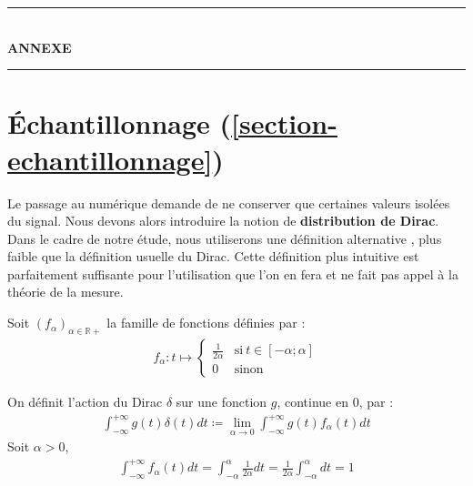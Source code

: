 \begin{center}
    \rule{\textwidth}{1pt} \\[0.5cm]
    {\Huge \bfseries ANNEXE} \\[0.4cm]
    \rule{\textwidth}{1pt}
\end{center}

\section*{Échantillonnage (\ref{section-echantillonnage})}
\label{preuve-echantillonnage}

Le passage au numérique demande de ne conserver que certaines valeurs isolées du signal. Nous devons alors introduire la notion de \textbf{distribution de Dirac}. Dans le cadre de notre étude, nous utiliserons une définition alternative \cite{dirac} , plus faible que la définition usuelle du Dirac. Cette définition plus intuitive est parfaitement suffisante pour l'utilisation que l'on en fera et ne fait pas appel à la théorie de la mesure.

Soit $(f_\alpha)_{\alpha \in \mathbb{\mathbb{R}+}}$ la famille de fonctions définies par :
\begin{align*}
    f_\alpha : t \mapsto \left\{ \begin{array}{cl} \frac{1}{2\alpha} & \text{si} \ t \in [-\alpha;\alpha] \\ 0 &  \text{sinon} 
\end{array} \right.
\end{align*}

On définit l'action du Dirac $\delta$ sur une fonction $g$, continue en $0$, par :
\begin{align*}
    \int_{-\infty}^{+\infty} g(t) \delta(t) dt \coloneqq \lim_{\alpha \to 0}  \int_{-\infty}^{+\infty} g(t) f_\alpha(t) dt
\end{align*}
Soit $\alpha > 0$,
\begin{align*}
    \int_{-\infty}^{+\infty} f_\alpha(t) dt = \int_{-\alpha}^{\alpha} \frac{1}{2\alpha} dt = \frac{1}{2\alpha} \int_{-\alpha}^{\alpha} dt = 1
\end{align*}

